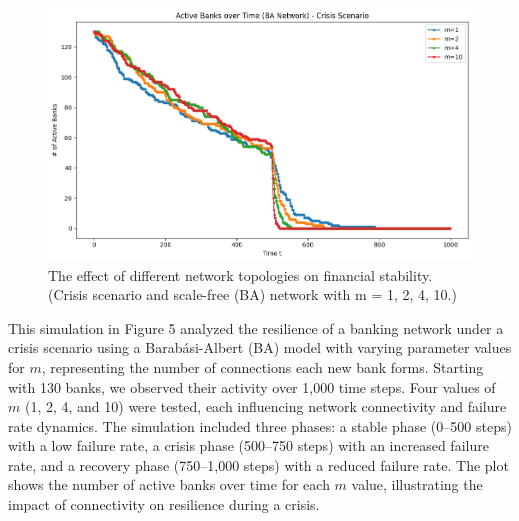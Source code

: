 \documentclass{article} %
\begin{document}
\begin{figure}[h]
    \centering
    \includegraphics[width=0.8\linewidth]{Figures/Figure_3_1.png}
    \caption{The effect of different network topologies on financial stability. (Crisis scenario and scale-free (BA) network with m = 1, 2, 4, 10.)}
    \label{fig:figure3.1}
\end{figure}
This simulation in Figure 5 analyzed the resilience of a banking network under a crisis scenario using a Barabási-Albert (BA) model with varying parameter values for \( m \), representing the number of connections each new bank forms. Starting with 130 banks, we observed their activity over 1,000 time steps. Four values of \( m \) (1, 2, 4, and 10) were tested, each influencing network connectivity and failure rate dynamics. The simulation included three phases: a stable phase (0--500 steps) with a low failure rate, a crisis phase (500--750 steps) with an increased failure rate, and a recovery phase (750--1,000 steps) with a reduced failure rate. The plot shows the number of active banks over time for each \( m \) value, illustrating the impact of connectivity on resilience during a crisis.
\end{document}
